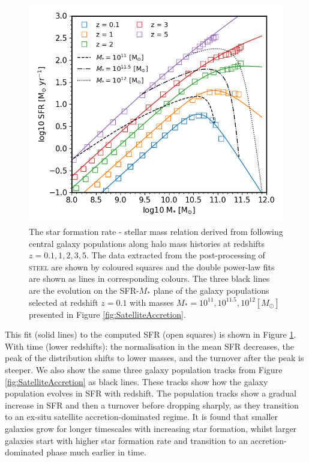 \begin{figure}[h]
    \centering
    \includegraphics[width = 0.8\linewidth]{Figures/Chapter4/HMC_DPL.png}
    \caption{The star formation rate - stellar mass relation derived from following central galaxy populations along halo mass histories at redshifts $z = 0.1, 1, 2, 3, 5$. The data extracted from the post-processing of \textsc{steel} are shown by coloured squares and the double power-law fits are shown as lines in corresponding colours. The three black lines are the evolution on the SFR-$M_{*}$ plane of the galaxy populations selected at redshift $z=0.1$ with masses $M_* = 10^{11}, 10^{11.5}, 10^{12} [M_{\odot}]$  presented in Figure \ref{fig:SatelliteAccretion}.}
    \label{fig:SFR_DPL}
\end{figure}

This fit (solid lines) to the computed SFR (open squares) is shown in Figure \ref{fig:SFR_DPL}. With time (lower redshifts): the normalisation in the mean SFR decreases, the peak of the distribution shifts to lower masses, and the turnover after the peak is steeper. We also show the same three galaxy population tracks from Figure \ref{fig:SatelliteAccretion} as black lines. These tracks show how the galaxy population evolves in SFR with redshift. The population tracks show a gradual increase in SFR and then a turnover before dropping sharply, as they transition to an ex-situ satellite accretion-dominated regime. It is found that smaller galaxies grow for longer timescales with increasing star formation, whilst larger galaxies start with higher star formation rate and transition to an accretion-dominated phase much earlier in time.

